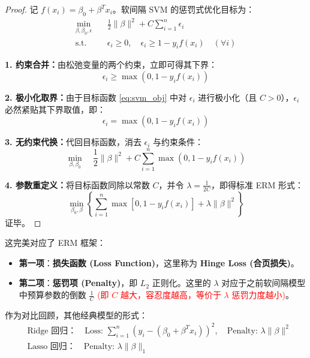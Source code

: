 \documentclass[UTF8]{ctexart}
\numberwithin{equation}{section}
\begin{document}
\begin{proof}
记 $f(x_i) = \beta_0 + \beta^T x_i$。软间隔 SVM 的惩罚式优化目标为：
\begin{align}
    \min_{\beta, \beta_0, \epsilon} \quad & \frac{1}{2}\|\beta\|^2 + C \sum_{i=1}^n \epsilon_i \label{eq:svm_obj} \\
    \text{s.t.} \quad & \epsilon_i \ge 0, \quad \epsilon_i \ge 1 - y_i f(x_i) \quad (\forall i) \nonumber
\end{align}

\textbf{1. 约束合并：}由松弛变量的两个约束，立即可得其下界：
\begin{equation}
    \epsilon_i \ge \max(0, 1 - y_i f(x_i))
\end{equation}

\textbf{2. 极小化取界：}由于目标函数 \eqref{eq:svm_obj} 中对 $\epsilon_i$ 进行极小化（且 $C>0$），$\epsilon_i$ 必然紧贴其下界取值，即：
\begin{equation}
    \epsilon_i = \max(0, 1 - y_i f(x_i))
\end{equation}

\textbf{3. 无约束代换：}代回目标函数，消去 $\epsilon_i$ 与约束条件：
\begin{equation}
    \min_{\beta, \beta_0} \quad \frac{1}{2}\|\beta\|^2 + C \sum_{i=1}^n \max(0, 1 - y_i f(x_i))
\end{equation}

\textbf{4. 参数重定义：}将目标函数同除以常数 $C$，并令 $\lambda = \frac{1}{2C}$，即得标准 ERM 形式：
\begin{equation}
    \min_{\beta_0, \beta} \left\{ \sum_{i=1}^n \max[0, 1 - y_i f(x_i)] + \lambda \|\beta\|^2 \right\}
\end{equation}
证毕。
\end{proof}

这完美对应了 ERM 框架：
\begin{itemize}
    \item \textbf{第一项}：\textbf{损失函数 (Loss Function)}，这里称为 \textbf{Hinge Loss (合页损失)}。
    \item \textbf{第二项}：\textbf{惩罚项 (Penalty)}，即 $L_2$ 正则化。这里的 $\lambda$ 对应于之前软间隔模型中预算参数的倒数 $\frac{1}{C}$ \textcolor{red}{(即 $C$ 越大，容忍度越高，等价于 $\lambda$ 惩罚力度越小)}。
\end{itemize}

作为对比回顾，其他经典模型的形式：
\begin{align*}
    & \text{Ridge 回归：} \quad \text{Loss: } \sum_{i=1}^n (y_i - (\beta_0 + \beta^T x_i))^2, \quad \text{Penalty: } \lambda \|\beta\|^2 \\
    & \text{Lasso 回归：} \quad \text{Penalty: } \lambda \|\beta\|_1
\end{align*}
\end{document}
